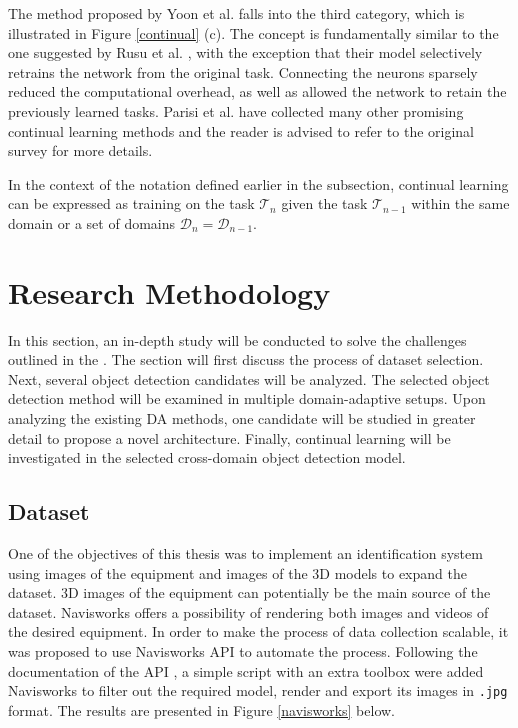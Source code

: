 \documentclass[english, 12pt, a4paper, elec, utf8, a-1b, online]{aaltothesis}
\begin{document}
The method proposed by Yoon et al. \cite{Yoon2017} falls into the third category, which is illustrated in Figure \ref{continual} (c). The concept is fundamentally similar to the one suggested by Rusu et al. \cite{Rusu2016}, with the exception that their model selectively retrains the network from the original task. Connecting the neurons sparsely reduced the computational overhead, as well as allowed the network to retain the previously learned tasks. Parisi et al. \cite{Parisi2018} have collected many other promising continual learning methods and the reader is advised to refer to the original survey for more details.   

In the context of the notation defined earlier in the  subsection, continual learning can be expressed as training on the task $\mathcal{T}_n$ given the task $\mathcal{T}_{n-1}$ within the same domain or a set of domains $\mathcal{D}_{n} = \mathcal{D}_{n-1}$.   



\clearpage 

\section{Research Methodology}
\label{Methodology}

In this section, an in-depth study will be conducted to solve the challenges outlined in the . The section will first discuss the process of dataset selection. Next, several object detection candidates will be analyzed.  The selected object detection method will be examined in multiple domain-adaptive setups. Upon analyzing the existing DA methods, one candidate will be studied in greater detail to propose a novel architecture. Finally, continual learning will be investigated in the selected cross-domain object detection model. 


\subsection{Dataset}
\label{datasets} 
One of the objectives of this thesis was to implement an identification system using images of the equipment and images of the 3D models to expand the dataset. 3D images of the equipment can potentially be the main source of the dataset. Navisworks offers a possibility of rendering both images and videos of the desired equipment. In order to make the process of data collection scalable, it was proposed to use Navisworks API to automate the process. Following the documentation of the API  \cite{navisworks}, a simple script with an extra toolbox were added Navisworks to filter out the required model, render and export its images in \texttt{.jpg} format. The results are presented in Figure \ref{navisworks} below.
\end{document}
